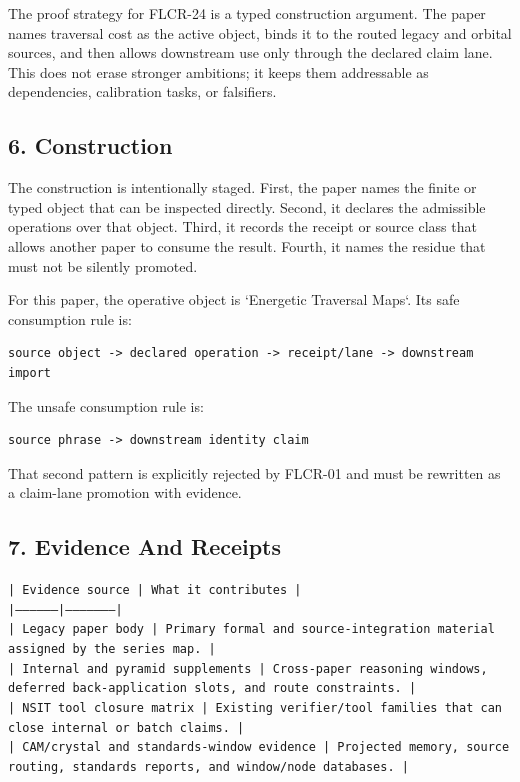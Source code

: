 \documentclass[11pt]{article}
\begin{document}
The proof strategy for FLCR-24 is a typed construction argument. The paper names traversal cost as the active object, binds it to the routed legacy and orbital sources, and then allows downstream use only through the declared claim lane. This does not erase stronger ambitions; it keeps them addressable as dependencies, calibration tasks, or falsifiers.

\subsection*{6. Construction}

The construction is intentionally staged. First, the paper names the finite or
typed object that can be inspected directly. Second, it declares the admissible
operations over that object. Third, it records the receipt or source class that
allows another paper to consume the result. Fourth, it names the residue that
must not be silently promoted.

For this paper, the operative object is `Energetic Traversal Maps`. Its safe consumption
rule is:

\begin{verbatim}
source object -> declared operation -> receipt/lane -> downstream import
\end{verbatim}

The unsafe consumption rule is:

\begin{verbatim}
source phrase -> downstream identity claim
\end{verbatim}

That second pattern is explicitly rejected by FLCR-01 and must be rewritten as
a claim-lane promotion with evidence.

\subsection*{7. Evidence And Receipts}

\noindent\texttt{| Evidence source | What it contributes |}\\
\noindent\texttt{|-----------------|---------------------|}\\
\noindent\texttt{| Legacy paper body | Primary formal and source-integration material assigned by the series map. |}\\
\noindent\texttt{| Internal and pyramid supplements | Cross-paper reasoning windows, deferred back-application slots, and route constraints. |}\\
\noindent\texttt{| NSIT tool closure matrix | Existing verifier/tool families that can close internal or batch claims. |}\\
\noindent\texttt{| CAM/crystal and standards-window evidence | Projected memory, source routing, standards reports, and window/node databases. |}\\
\end{document}
